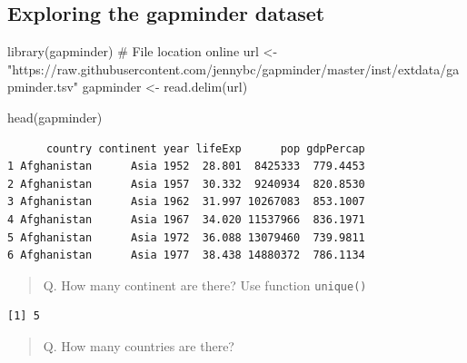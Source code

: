 \documentclass[
  letterpaper,
  DIV=11,
  numbers=noendperiod]{scrartcl}
\newenvironment{Shaded}{\begin{snugshade}}{\end{snugshade}}
\newcommand{\CommentTok}[1]{\textcolor[rgb]{0.37,0.37,0.37}{#1}}
\newcommand{\FunctionTok}[1]{\textcolor[rgb]{0.28,0.35,0.67}{#1}}
\newcommand{\NormalTok}[1]{\textcolor[rgb]{0.00,0.23,0.31}{#1}}
\newcommand{\OtherTok}[1]{\textcolor[rgb]{0.00,0.23,0.31}{#1}}
\newcommand{\SpecialCharTok}[1]{\textcolor[rgb]{0.37,0.37,0.37}{#1}}
\newcommand{\StringTok}[1]{\textcolor[rgb]{0.13,0.47,0.30}{#1}}
\begin{document}
\hypertarget{exploring-the-gapminder-dataset}{%
\subsection{Exploring the gapminder
dataset}\label{exploring-the-gapminder-dataset}}

\begin{Shaded}
\begin{Highlighting}[]
\FunctionTok{library}\NormalTok{(gapminder)}
\CommentTok{\# File location online}
\NormalTok{url }\OtherTok{\textless{}{-}} \StringTok{"https://raw.githubusercontent.com/jennybc/gapminder/master/inst/extdata/gapminder.tsv"}
\NormalTok{gapminder }\OtherTok{\textless{}{-}} \FunctionTok{read.delim}\NormalTok{(url)}
\end{Highlighting}
\end{Shaded}

\begin{Shaded}
\begin{Highlighting}[]
\FunctionTok{head}\NormalTok{(gapminder)}
\end{Highlighting}
\end{Shaded}

\begin{verbatim}
      country continent year lifeExp      pop gdpPercap
1 Afghanistan      Asia 1952  28.801  8425333  779.4453
2 Afghanistan      Asia 1957  30.332  9240934  820.8530
3 Afghanistan      Asia 1962  31.997 10267083  853.1007
4 Afghanistan      Asia 1967  34.020 11537966  836.1971
5 Afghanistan      Asia 1972  36.088 13079460  739.9811
6 Afghanistan      Asia 1977  38.438 14880372  786.1134
\end{verbatim}

\begin{quote}
Q. How many continent are there? Use function \texttt{unique()}
\end{quote}

\begin{Shaded}
\end{Shaded}

\begin{verbatim}
[1] 5
\end{verbatim}

\begin{quote}
Q. How many countries are there?
\end{quote}
\end{document}
